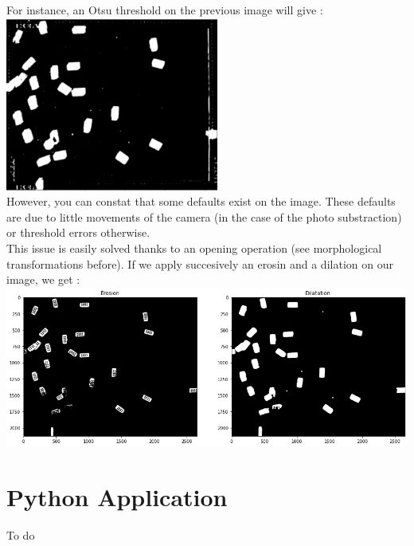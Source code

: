 \documentclass{article}
\begin{document}
For instance, an Otsu threshold on the previous image will give :\\
\includegraphics[width=7cm]{images/img24.png}\\

However, you can constat that some defaults exist on the image. These defaults are due to little movements of the camera (in the case of the photo substraction) or threshold errors otherwise.\\

This issue is easily solved thanks to an opening operation (see morphological transformations before).
If we apply succesively an erosin and a dilation on our image, we get :\\
\includegraphics[width=14cm]{images/img25.png}\\ 


\section{Python Application}

To do
\end{document}
